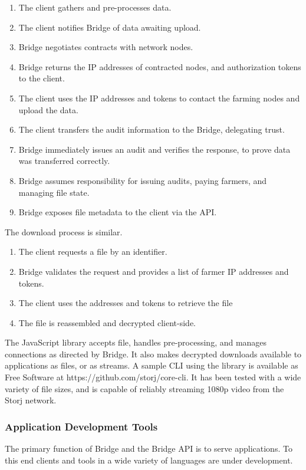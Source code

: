 \documentclass[a4paper,10pt]{article}
\begin{document}
\begin{enumerate}
\item The client gathers and pre-processes data.
\item The client notifies Bridge of data awaiting upload.
\item Bridge negotiates contracts with network nodes.
\item Bridge returns the IP addresses of contracted nodes, and authorization tokens to the client.
\item The client uses the IP addresses and tokens to contact the farming nodes and upload the data.
\item The client transfers the audit information to the Bridge, delegating trust.
\item Bridge immediately issues an audit and verifies the response, to prove data was transferred correctly.
\item Bridge assumes responsibility for issuing audits, paying farmers, and managing file state.
\item Bridge exposes file metadata to the client via the API.
\end{enumerate}

The download process is similar.

\begin{enumerate}
\item The client requests a file by an identifier.
\item Bridge validates the request and provides a list of farmer IP addresses and tokens.
\item The client uses the addresses and tokens to retrieve the file
\item The file is reassembled and decrypted client-side.
\end{enumerate}

The JavaScript library accepts file, handles pre-processing, and manages connections as directed by Bridge. It also makes decrypted downloads available to applications as files, or as streams. A sample CLI using the library is available as Free Software at https://github.com/storj/core-cli. It has been tested with a wide variety of file sizes, and is capable of reliably streaming 1080p video from the Storj network.

\subsubsection{Application Development Tools}
The primary function of Bridge and the Bridge API is to serve applications. To this end clients and tools in a wide variety of languages are under development.
\end{document}
